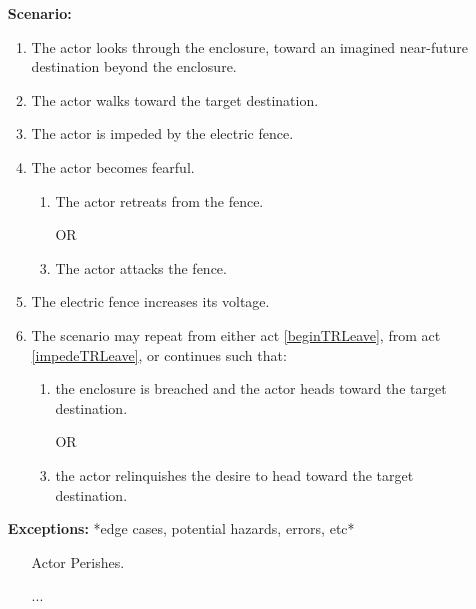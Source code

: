 \documentclass[12pt]{article}
\begin{document}
\begin{itemize}
        \item[]\textbf{Scenario:}                    
            \begin{enumerate}
                \item The actor looks through the enclosure, 
                toward an imagined near-future destination beyond
                the enclosure. \label{beginTRLeave}
                \item The actor walks toward the target destination.
                \item The actor is impeded by the electric fence. \label{impedeTRLeave}
                \item The actor becomes fearful.
                \begin{enumerate}
                    \item The actor retreats from the fence.
                    \item[OR]
                    \item The actor attacks the fence. 
                \end{enumerate}
                \item The electric fence increases its voltage.
                \item The scenario may repeat from either 
                act \ref{beginTRLeave}, from act \ref{impedeTRLeave}, 
                or continues such that:
                \begin{enumerate}
                    \item the enclosure is breached and the actor 
                    heads toward the target destination.
                    \item[OR]
                    \item the actor relinquishes the desire to head
                    toward the target destination.
                    \end{enumerate}
            \end{enumerate}

        \item[]\textbf{Exceptions:}
        *edge cases, potential hazards, errors, etc*
            \begin{itemize}
                \item[] Actor Perishes.
                \item[]                 
                \item[] ...
            \end{itemize}


\end{itemize}
\end{document}
